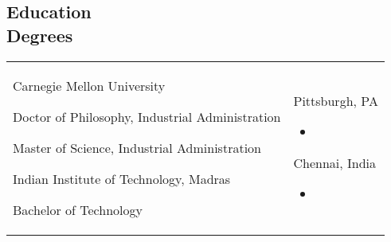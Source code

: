 \documentclass[margin, line, centered, 10pt]{res}
\begin{document}
\begin{resume}
\section{\sc Education \\Degrees}
\vspace{-.07in}
\begin{tabular}{@{}p{3.75in}p{2in}}

\begin{list}{\quad}{}
\item {Carnegie Mellon University} 
\begin{list}{\quad}{}
\item Doctor of Philosophy, Industrial Administration %
\item Master of Science, Industrial Administration
\end{list}
\item {Indian Institute of Technology, Madras}
\begin{list}{\quad}{}
\item Bachelor of Technology %
\end{list}
\end{list}%
& 
\begin{description}
\item Pittsburgh, PA
\begin{itemize}
\item %
\end{itemize}
\item
\item 
\item Chennai, India
\begin{itemize}
\item %
\end{itemize}
\end{description}
\end{tabular}


\end{resume}
\end{document}
